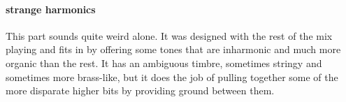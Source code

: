 \paragraph{strange harmonics}
This part sounds quite weird alone. It was designed with the rest
of the mix playing and fits in by offering some tones that are
inharmonic and much more organic than the rest.
It has an ambiguous timbre, sometimes stringy and sometimes more brass-like,
but it does the job of pulling together some of the more disparate
higher bits by providing ground between them.
